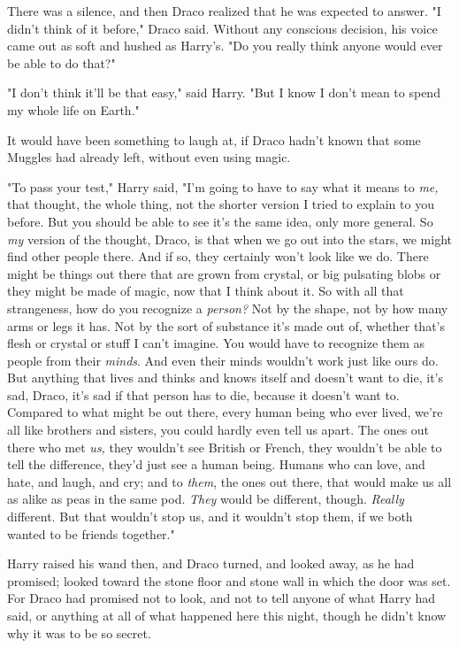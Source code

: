 There was a silence, and then Draco realized that he was expected to answer. "I
didn't think of it before," Draco said. Without any conscious decision, his
voice came out as soft and hushed as Harry's. "Do you really think anyone would
ever be able to do that?"

"I don't think it'll be that easy," said Harry. "But I know I don't mean to
spend my whole life on Earth."

It would have been something to laugh at, if Draco hadn't known that some
Muggles had already left, without even using magic.

"To pass your test," Harry said, "I'm going to have to say what it means to
\emph{me,} that thought, the whole thing, not the shorter version I tried to
explain to you before. But you should be able to see it's the same idea, only
more general. So \emph{my} version of the thought, Draco, is that when we go
out into the stars, we might find other people there. And if so, they certainly
won't look like we do. There might be things out there that are grown from
crystal, or big pulsating blobs{\el} or they might be made of magic, now
that I think about it. So with all that strangeness, how do you recognize a
\emph{person?} Not by the shape, not by how many arms or legs it has. Not by
the sort of substance it's made out of, whether that's flesh or crystal or
stuff I can't imagine. You would have to recognize them as people from their
\emph{minds}. And even their minds wouldn't work just like ours do. But
anything that lives and thinks and knows itself and doesn't want to die, it's
sad, Draco, it's sad if that person has to die, because it doesn't want to.
Compared to what might be out there, every human being who ever lived, we're
all like brothers and sisters, you could hardly even tell us apart. The ones
out there who met \emph{us,} they wouldn't see British or French, they wouldn't
be able to tell the difference, they'd just see a human being. Humans who can
love, and hate, and laugh, and cry; and to \emph{them}, the ones out there,
that would make us all as alike as peas in the same pod. \emph{They} would be
different, though. \emph{Really} different. But that wouldn't stop us, and it
wouldn't stop them, if we both wanted to be friends together."

Harry raised his wand then, and Draco turned, and looked away, as he had
promised; looked toward the stone floor and stone wall in which the door was
set. For Draco had promised not to look, and not to tell anyone of what Harry
had said, or anything at all of what happened here this night, though he didn't
know why it was to be so secret.

